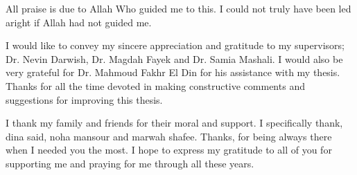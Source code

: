 \documentclass[11pt,doublespace]{SketchThesis}
\begin{document}
\begin{acknowledgments}     
All praise is due to Allah Who guided me to this. I could not truly have been led aright if Allah had not guided me.

I would like to convey my sincere appreciation and gratitude to my supervisors; Dr. Nevin Darwish, Dr. Magdah Fayek and Dr. Samia Mashali. I would also be very grateful for Dr. Mahmoud Fakhr El Din for his assistance with my thesis. Thanks for all the time devoted in making constructive comments and suggestions for improving this thesis.

 I thank my family and friends for their moral and support. I specifically thank, dina said, noha mansour and marwah shafee. Thanks, for being always there when I needed you the most. I hope to express my gratitude to all of you for supporting me and praying for me through all these years.
 \end{acknowledgments}                                   %

\end{document}
